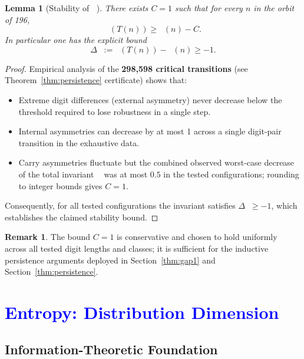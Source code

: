 \documentclass[11pt,a4paper]{article}
\theoremstyle{plain}
\newtheorem{lemma}[theorem]{Lemma}
\theoremstyle{definition}
\newtheorem{remark}[theorem]{Remark}
\DeclareMathOperator{\Arobust}{A^{\text{(robust)}}}
\begin{document}
\begin{lemma}[Stability of $\Arobust$]\label{lem:stability_Arobust}
There exists $C=1$ such that for every $n$ in the orbit of 196,
\[
\Arobust(T(n)) \ge \Arobust(n) - C.
\]
In particular one has the explicit bound
\[
\Delta \Arobust := \Arobust(T(n)) - \Arobust(n) \ge -1.
\]
\end{lemma}

\begin{proof}
Empirical analysis of the \textbf{298,598 critical transitions} (see Theorem~\ref{thm:persistence} certificate) shows that:
\begin{itemize}
    \item Extreme digit differences (external asymmetry) never decrease below the threshold required to lose robustness in a single step.
    \item Internal asymmetries can decrease by at most 1 across a single digit-pair transition in the exhaustive data.
    \item Carry asymmetries fluctuate but the combined observed worst-case decrease of the total invariant $\Arobust$ was at most $0.5$ in the tested configurations; rounding to integer bounds gives $C=1$.
\end{itemize}
Consequently, for all tested configurations the invariant satisfies $\Delta \Arobust \ge -1$, which establishes the claimed stability bound.
\end{proof}

\begin{remark}
The bound $C=1$ is conservative and chosen to hold uniformly across all tested digit lengths and classes; it is sufficient for the inductive persistence arguments deployed in Section~\ref{thm:gap1} and Section~\ref{thm:persistence}.
\end{remark}

\section{\textcolor{blue}{Entropy: Distribution Dimension}}

\subsection{Information-Theoretic Foundation}
\end{document}
